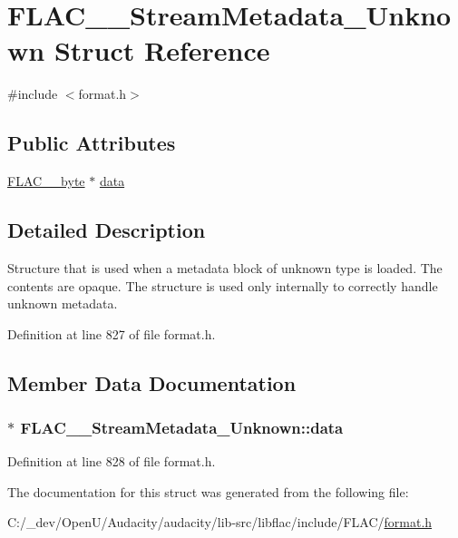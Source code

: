 \hypertarget{struct_f_l_a_c_____stream_metadata___unknown}{}\section{F\+L\+A\+C\+\_\+\+\_\+\+Stream\+Metadata\+\_\+\+Unknown Struct Reference}
\label{struct_f_l_a_c_____stream_metadata___unknown}


{\ttfamily \#include $<$format.\+h$>$}

\subsection*{Public Attributes}
\begin{DoxyCompactItemize}
\item 
\hyperlink{ordinals_8h_a5eb569b12d5b047cdacada4d57924ee3}{F\+L\+A\+C\+\_\+\+\_\+byte} $\ast$ \hyperlink{struct_f_l_a_c_____stream_metadata___unknown_aacb09432bd01f2edcb5cebfc71efd79e}{data}
\end{DoxyCompactItemize}


\subsection{Detailed Description}
Structure that is used when a metadata block of unknown type is loaded. The contents are opaque. The structure is used only internally to correctly handle unknown metadata. 

Definition at line 827 of file format.\+h.



\subsection{Member Data Documentation}
\subsubsection[{\texorpdfstring{data}{data}}]{$\ast$ F\+L\+A\+C\+\_\+\+\_\+\+Stream\+Metadata\+\_\+\+Unknown\+::data}\hypertarget{struct_f_l_a_c_____stream_metadata___unknown_aacb09432bd01f2edcb5cebfc71efd79e}{}\label{struct_f_l_a_c_____stream_metadata___unknown_aacb09432bd01f2edcb5cebfc71efd79e}


Definition at line 828 of file format.\+h.



The documentation for this struct was generated from the following file\+:\begin{DoxyCompactItemize}
\item 
C\+:/\+\_\+dev/\+Open\+U/\+Audacity/audacity/lib-\/src/libflac/include/\+F\+L\+A\+C/\hyperlink{include_2_f_l_a_c_2format_8h}{format.\+h}\end{DoxyCompactItemize}
